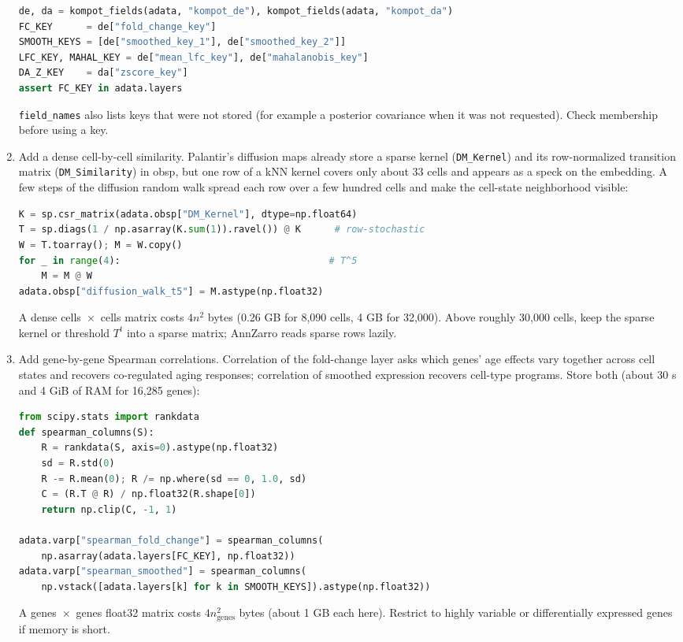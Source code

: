 \begin{enumerate}[start=3]
\begin{lstlisting}[language=Python]
de, da = kompot_fields(adata, "kompot_de"), kompot_fields(adata, "kompot_da")
FC_KEY      = de["fold_change_key"]
SMOOTH_KEYS = [de["smoothed_key_1"], de["smoothed_key_2"]]
LFC_KEY, MAHAL_KEY = de["mean_lfc_key"], de["mahalanobis_key"]
DA_Z_KEY    = da["zscore_key"]
assert FC_KEY in adata.layers
\end{lstlisting}
\critical{} \texttt{field\_names} also lists keys that were not stored (for example a posterior covariance when it was not requested). Check membership before using a key.
\troubleshoot{}

\item Add a dense cell-by-cell similarity. Palantir's diffusion maps already store a sparse kernel (\texttt{DM\_Kernel}) and its row-normalized transition matrix (\texttt{DM\_Similarity}) in obsp, but one row of a kNN kernel covers only about 33 cells and appears as a speck on the embedding. A few steps of the diffusion random walk spread each row over a few hundred cells and make the cell-state neighborhood visible:
\begin{lstlisting}[language=Python]
K = sp.csr_matrix(adata.obsp["DM_Kernel"], dtype=np.float64)
T = sp.diags(1 / np.asarray(K.sum(1)).ravel()) @ K      # row-stochastic
W = T.toarray(); M = W.copy()
for _ in range(4):                                     # T^5
    M = M @ W
adata.obsp["diffusion_walk_t5"] = M.astype(np.float32)
\end{lstlisting}
\critical{} A dense cells~$\times$~cells matrix costs $4n^2$ bytes (0.26 GB for 8,090 cells, 4 GB for 32,000). Above roughly 30,000 cells, keep the sparse kernel or threshold $T^t$ into a sparse matrix; AnnZarro reads sparse rows lazily.

\item Add gene-by-gene Spearman correlations. Correlation of the fold-change layer asks which genes' age effects vary together across cell states and recovers co-regulated aging responses; correlation of smoothed expression recovers cell-type programs. Store both (about 30 s and 4 GiB of RAM for 16,285 genes):
\begin{lstlisting}[language=Python]
from scipy.stats import rankdata
def spearman_columns(S):
    R = rankdata(S, axis=0).astype(np.float32)
    sd = R.std(0)
    R -= R.mean(0); R /= np.where(sd == 0, 1.0, sd)
    C = (R.T @ R) / np.float32(R.shape[0])
    return np.clip(C, -1, 1)

adata.varp["spearman_fold_change"] = spearman_columns(
    np.asarray(adata.layers[FC_KEY], np.float32))
adata.varp["spearman_smoothed"] = spearman_columns(
    np.vstack([adata.layers[k] for k in SMOOTH_KEYS]).astype(np.float32))
\end{lstlisting}
\critical{} A genes~$\times$~genes float32 matrix costs $4n_\mathrm{genes}^2$ bytes (about 1 GB each here). Restrict to highly variable or differentially expressed genes if memory is short.


\end{enumerate}
